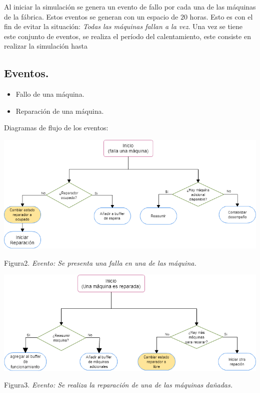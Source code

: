 \documentclass[10pt]{article}
\begin{document}
Al iniciar la simulación se genera un evento de fallo por cada una de las máquinas de la fábrica. Estos eventos se generan con un  espacio de $20$ horas. Esto es con el fin de evitar la situación: \emph{Todas las máquinas fallan a la vez}. Una vez se tiene este conjunto de eventos, se realiza el período del calentamiento, este consiste en realizar la simulación hasta 


\subsection{Eventos.}

\begin{itemize}
\item Fallo de una máquina.
\item Reparación de una máquina.
\end{itemize}

Diagramas de flujo de los eventos:
\begin{center}

\includegraphics[scale=0.47]{fallaMaquina.png}

Figura2. \emph{Evento: Se presenta una falla en una de las máquina.}
\end{center}
\begin{center}

\includegraphics[scale=0.47]{reparar.png}

Figura3. \emph{Evento: Se realiza la reparación de una de las máquinas dañadas.}
\end{center}
\end{document}
